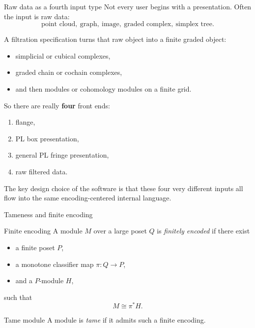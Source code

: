 \documentclass[aspectratio=169,11pt]{beamer}
\begin{document}
\begin{frame}{Raw data as a fourth input type}
	\small
	Not every user begins with a presentation. Often the input is raw data:
	\[
	\text{point cloud},\ \text{graph},\ \text{image},\ \text{graded complex},\ \text{simplex tree}.
	\]
	
	\vspace{0.5em}
	A filtration specification turns that raw object into a finite graded object:
	\begin{itemize}
		\item simplicial or cubical complexes,
		\item graded chain or cochain complexes,
		\item and then modules or cohomology modules on a finite grid.
	\end{itemize}
	
	\vspace{0.5em}
	So there are really \textbf{four} front ends:
	\begin{enumerate}
		\item flange,
		\item PL box presentation,
		\item general PL fringe presentation,
		\item raw filtered data.
	\end{enumerate}
	
	\vspace{0.5em}
	The key design choice of the software is that these four very different inputs
	all flow into the same encoding-centered internal language.
\end{frame}

\begin{frame}{Tameness and finite encoding}
	\small
	\begin{block}{Finite encoding}
		A module $M$ over a large poset $Q$ is \emph{finitely encoded} if there exist
		\begin{itemize}
			\item a finite poset $P$,
			\item a monotone classifier map $\pi : Q \to P$,
			\item and a $P$-module $H$,
		\end{itemize}
		such that
		\[
		M \cong \pi^* H.
		\]
	\end{block}
	
	\begin{block}{Tame module}
		A module is \emph{tame} if it admits such a finite encoding.
	\end{block}
\end{frame}
\end{document}
